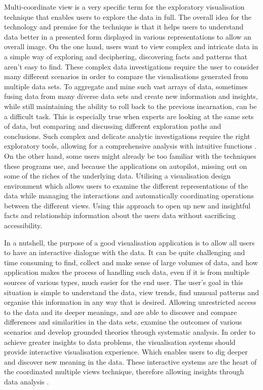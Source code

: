 Multi-coordinate view is a very specific term for the exploratory visualisation technique that enables users to explore the data in full. The overall idea for the technology and premise for the technique is that it helps users to understand data better in a presented form displayed in various representations to allow an overall image. On the one hand, users want to view complex and intricate data in a simple way of exploring and deciphering, discovering facts and patterns that aren't easy to find. These complex data investigations require the user to consider many different scenarios in order to compare the visualisations generated from multiple data sets. To aggregate and mine such vast arrays of data, sometimes fusing data from many diverse data sets and create new information and insights, while still maintaining the ability to roll back to the previous incarnation, can be a difficult task. This is especially true when experts are looking at the same sets of data, but comparing and discussing different exploration paths and conclusions. Such complex and delicate analytic investigations require the right exploratory tools, allowing for a comprehensive analysis with intuitive functions \cite{roberts2007state}. 
On the other hand, some users might already be too familiar with the techniques these programs use, and because the applications on autopilot, missing out on some of the riches of the underlying data. Utilising a visualisation design environment which allows users to examine the different representations of the data while managing the interactions and automatically coordinating operations between the different views. Using this approach to open up new and insightful facts and relationship information about the users data without sacrificing accessibility.

In a nutshell, the purpose of a good visualisation application is to allow all users to have an interactive dialogue with the data. It can be quite challenging and time consuming to find, collect and make sense of large volumes of data, and how application makes the process of handling such data, even if it is from multiple sources of various types, much easier for the end user. The user's goal in this situation is simple to understand the data, view trends, find unusual patterns and organise this information in any way that is desired. Allowing unrestricted access to the data and its deeper meanings, and are able to discover and compare differences and similarities in the data sets, examine the outcomes of various scenarios and develop grounded theories through systematic analysis. In order to achieve greater insights to data problems, the visualisation systems should provide interactive visualisation experience. Which enables users to dig deeper and discover new meaning in the data. These interactive systems are the heart of the coordinated multiple views technique, therefore allowing insights through data analysis \cite{zhang2014visual}.

